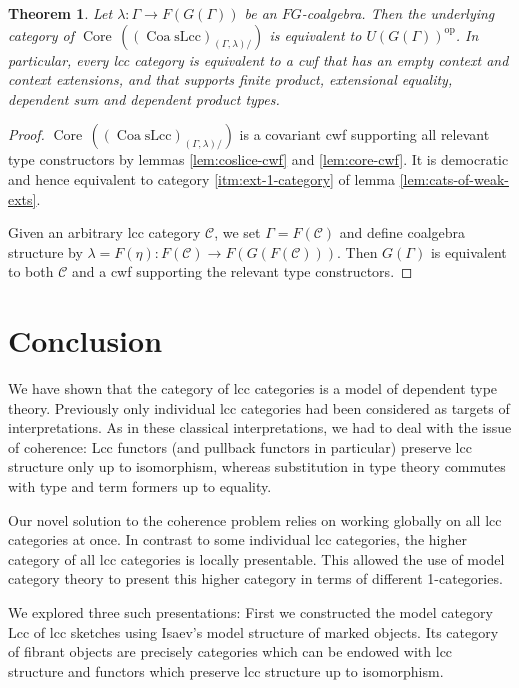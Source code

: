 \documentclass[a4paper]{article}
\newtheorem{theorem}{Theorem}
\theoremstyle{remark}
\theoremstyle{definition}
\begin{document}
\begin{theorem}
  \label{th:context-as-model}
  Let $\lambda : \Gamma \rightarrow F(G(\Gamma))$ be an $FG$-coalgebra.
  Then the underlying category of $\operatorname{Core} \, ((\operatorname{Coa} \mathrm{sLcc})_{(\Gamma, \lambda) /})$ is equivalent to $U(G(\Gamma))^\mathrm{op}$.
  In particular, every lcc category is equivalent to a cwf that has an empty context and context extensions, and that supports finite product, extensional equality, dependent sum and dependent product types.
\end{theorem}
\begin{proof}
  $\operatorname{Core} \, ((\operatorname{Coa} \mathrm{sLcc})_{(\Gamma, \lambda) /})$ is a covariant cwf supporting all relevant type constructors by lemmas \ref{lem:coslice-cwf} and \ref{lem:core-cwf}.
  It is democratic and hence equivalent to category \ref{itm:ext-1-category} of lemma \ref{lem:cats-of-weak-exts}.

  Given an arbitrary lcc category $\mathcal{C}$, we set $\Gamma = F(\mathcal{C})$ and define coalgebra structure by $\lambda = F(\eta) : F(\mathcal{C}) \rightarrow F(G(F(\mathcal{C})))$.
  Then $G(\Gamma)$ is equivalent to both $\mathcal{C}$ and a cwf supporting the relevant type constructors.
\end{proof}

\section{Conclusion}

We have shown that the category of lcc categories is a model of dependent type theory.
Previously only individual lcc categories had been considered as targets of interpretations.
As in these classical interpretations, we had to deal with the issue of coherence:
Lcc functors (and pullback functors in particular) preserve lcc structure only up to isomorphism, whereas substitution in type theory commutes with type and term formers up to equality.

Our novel solution to the coherence problem relies on working globally on all lcc categories at once.
In contrast to some individual lcc categories, the higher category of all lcc categories is locally presentable.
This allowed the use of model category theory to present this higher category in terms of different 1-categories.

We explored three such presentations:
First we constructed the model category $\mathrm{Lcc}$ of lcc sketches using Isaev's model structure of marked objects.
Its category of fibrant objects are precisely categories which can be endowed with lcc structure and functors which preserve lcc structure up to isomorphism.
\end{document}
